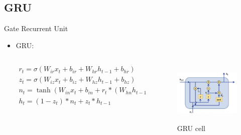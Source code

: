\documentclass[aspectratio= 169]{beamer}
\begin{document}
		\subsection{GRU}
		\begin{frame}{Gate Recurrent Unit}
			\begin{itemize}
				\item GRU:
					\begin{columns}[T]
						\begin{column}{0.45\textwidth}
							$${
								\begin{array}{l}
									r_t = \sigma\left(W_{ir} x_t + b_{ir} + W_{hr}h_{t-1} + b_{hr}\right)\\
									z_t = \sigma\left(W_{iz}x_t + b_{iz} + W_{hz}h_{t - 1} + b_{hz}\right)\\
									n_t = \tanh\left(W_{in} x_t + b_{in} + r_t * \left({W_{hn}h_{t - 1} + b_{hn}}\right)\right)\\
									h_t = (1 - z_t) * n_t + z_t * h_{t - 1}
								\end{array}
							}$$
						\end{column}
						\hfill
						\begin{column}{0.45\textwidth}
							\begin{figure}[H]
								\includegraphics[width= 4.5cm, height= 3cm]{GRU_cell.jpg}
								\caption{GRU cell}
							\end{figure}
						\end{column}
					\end{columns}
			\end{itemize}
		\end{frame}
	
\end{document}
